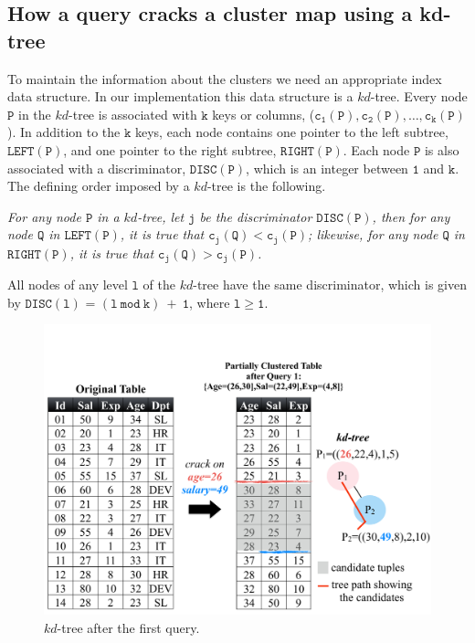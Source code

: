 \subsection{How a query cracks a cluster map using a kd-tree}
\label{subsec:kdtree_adaptive}

To maintain the information about the clusters we need an appropriate index 
data structure. In our implementation this data structure is a $kd$-tree.
Every node $\mathtt{P}$ in the $kd$-tree is associated with $\mathtt{k}$ 
keys or columns, ($\mathtt{c_1(P), c_2(P),\ldots,c_k(P)}$).
In addition to the $\mathtt{k}$ keys, each node contains one pointer to the
left subtree, $\mathtt{LEFT(P)}$, and one pointer to the right subtree, 
$\mathtt{RIGHT(P)}$. Each node $\mathtt{P}$ is also associated with a
discriminator, $\mathtt{DISC(P)}$, which is an integer between 
$\mathtt{1}$ and $\mathtt{k}$.
The defining order imposed by a $kd$-tree is the following.

\begin{flushleft}
\begin{mydef}
\emph{For any node $\mathtt{P}$ in a $kd$-tree, let $\mathtt{j}$ be the
discriminator $\mathtt{DISC(P)}$, then for any node $\mathtt{Q}$ in 
$\mathtt{LEFT(P)}$, it is true that $\mathtt{c_j(Q) < c_j(P)}$;
likewise, for any node $\mathtt{Q}$ in $\mathtt{RIGHT(P)}$, it is true that
$\mathtt{c_j(Q) > c_j(P)}$.}
\end{mydef}
\end{flushleft}

All nodes of any level $\mathtt{l}$ of the $kd$-tree have the same 
discriminator, which is given by $\mathtt{DISC(l)}$ = $\mathtt{(l\ mod\ k)\ +\ 1}$,
where $\mathtt{l \geq 1}$.

\begin{figure}[t]
\begin{center}
\vspace*{3\baselineskip}
\includegraphics[trim=0cm 2cm 0cm 8.5cm, width=\columnwidth]{Figures/mcrack_kdtree}
\caption{$kd$-tree after the first query.}
\label{fig:pkdtree}
\end{center}
\end{figure}


